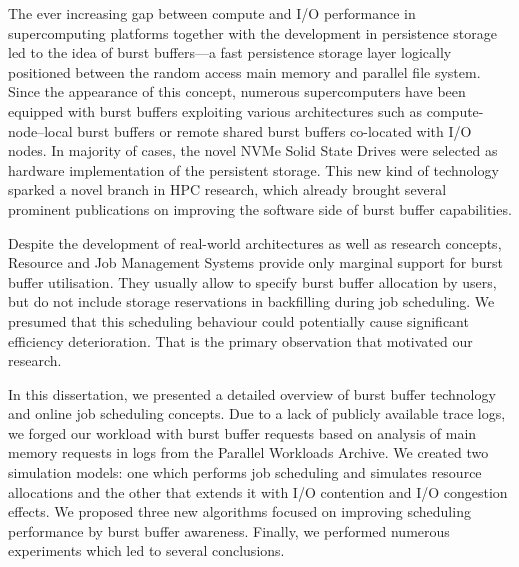 \documentclass[thesis-en.tex]{subfiles}
\begin{document}
The ever increasing gap between compute and I/O performance in supercomputing platforms together with the development in persistence storage led to the idea of burst buffers---a fast persistence storage layer logically positioned between the random access main memory and parallel file system. Since the appearance of this concept, numerous supercomputers have been equipped with burst buffers exploiting various architectures such as compute-node--local burst buffers or remote shared burst buffers co-located with I/O nodes. In majority of cases, the novel NVMe Solid State Drives were selected as hardware implementation of the persistent storage. This new kind of technology sparked a novel branch in HPC research, which already brought several prominent publications on improving the software side of burst buffer capabilities.

Despite the development of real-world architectures as well as research concepts, Resource and Job Management Systems provide only marginal support for burst buffer utilisation. They usually allow to specify burst buffer allocation by users, but do not include storage reservations in backfilling during job scheduling. We presumed that this scheduling behaviour could potentially cause significant efficiency deterioration. That is the primary observation that motivated our research.

In this dissertation, we presented a detailed overview of burst buffer technology and online job scheduling concepts. Due to a lack of publicly available trace logs, we forged our workload with burst buffer requests based on analysis of main memory requests in logs from the Parallel Workloads Archive. We created two simulation models: one which performs job scheduling and simulates resource allocations and the other that extends it with I/O contention and I/O congestion effects. We proposed three new algorithms focused on improving scheduling performance by burst buffer awareness. Finally, we performed numerous experiments which led to several conclusions.
\end{document}
